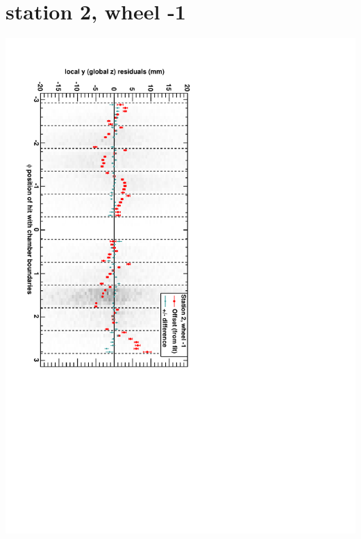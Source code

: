 \documentclass[compress]{beamer}
\begin{document}
\section*{station 2, wheel -1}
\begin{frame} \vfill \mbox{\hspace{-1 cm}\includegraphics[height=1.2\linewidth, angle=90]{DTzVsPhi_st2_whB.pdf}} \end{frame}
\end{document}
